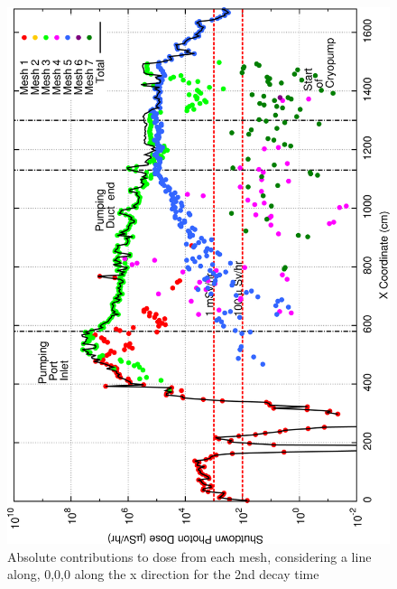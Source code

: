 \documentclass[12pt]{article}
\begin{document}
\begin{figure}[ht!]
\centering
\includegraphics[clip,scale=0.25]{../plots/crosstalk/nob4c/lp/dc2.png}
\caption{Absolute contributions to dose from each mesh, considering a line along, 0,0,0 along the x direction for the 2nd decay time}
\label{fig:ct_lp_dc2}
\end{figure}
\end{document}
